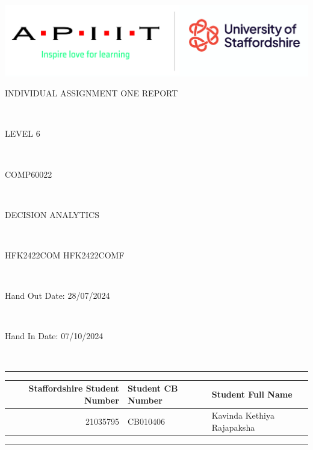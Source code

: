 \documentclass[a4Paper,12pt]{report}
\begin{document}
\begin{titlepage}
\begin{center}
\includegraphics[scale=0.1]{images/a_and_s_logo.png}\\[1cm]
	\begin{Huge}
	INDIVIDUAL ASSIGNMENT ONE REPORT
	\end{Huge}\\[1cm]
    \begin{Large}
    LEVEL 6
    \end{Large}\\[0.5cm]
    \begin{Large}
    COMP60022
    \end{Large}\\[1cm]
    \begin{huge}
    DECISION ANALYTICS
    \end{huge}\\[0.5cm]
    \begin{LARGE}
    HFK2422COM HFK2422COMF
    \end{LARGE}\\[1cm]
    \begin{large}
    Hand Out Date: 28/07/2024
    \end{large}\\[0.5cm]
    \begin{large}
    Hand In Date: 07/10/2024
    \end{large}\\[1cm]
    \hrule
    \vspace{1cm}
    \begin{center}
    \begin{tabular}{rll}\hline
    \textbf{Staffordshire Student Number} & \textbf{Student CB Number} & \textbf{Student Full Name}\\\hline
     21035795 & CB010406 & Kavinda Kethiya Rajapaksha\\\hline
    \end{tabular}
    \end{center}
    \vspace{1cm}
    \hrule
\end{center}
\end{titlepage}
\tableofcontents
\listoftables
\listoffigures
\pagestyle{fancyplain}
\end{document}
